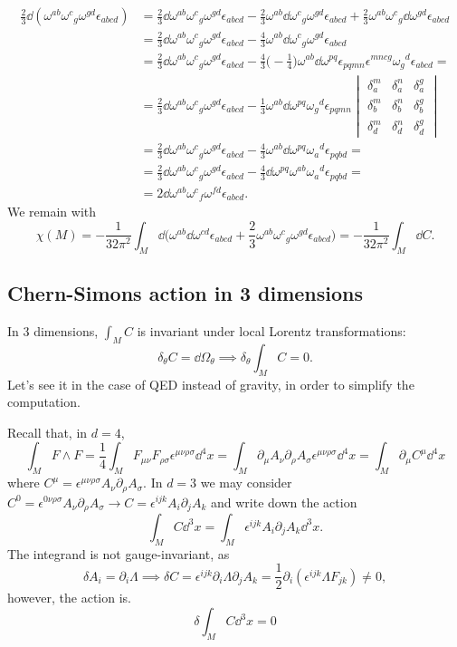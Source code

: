 \documentclass[a4paper,12pt]{book}
\begin{document}
\begin{align*}
\frac23\dd(\omega^{ab}\omega^c{}_g\omega^{gd}\epsilon_{abcd})&=\frac23\dd\omega^{ab}\omega^c{}_g\omega^{gd}\epsilon_{abcd}-\frac23\omega^{ab}\dd\omega^c{}_g\omega^{gd}\epsilon_{abcd}+\frac23\omega^{ab}\omega^c{}_g\dd\omega^{gd}\epsilon_{abcd}\\
&=\frac23\dd\omega^{ab}\omega^c{}_g\omega^{gd}\epsilon_{abcd}-\frac43\omega^{ab}\dd\omega^c{}_g\omega^{gd}\epsilon_{abcd}\\
&=\frac23\dd\omega^{ab}\omega^c{}_g\omega^{gd}\epsilon_{abcd}-\frac43\biggl(-\frac14\biggr)\omega^{ab}\dd\omega^{pq}\epsilon_{pqmn}\epsilon^{mncg}\omega_g{}^d\epsilon_{abcd}=\\
&=\frac23\dd\omega^{ab}\omega^c{}_g\omega^{gd}\epsilon_{abcd}-\frac13\omega^{ab}\dd\omega^{pq}\omega_g{}^d\epsilon_{pqmn}
\begin{vmatrix}
\delta^m_a & \delta^n_a & \delta^g_a\\
\delta^m_b & \delta^n_b & \delta^g_b\\
\delta^m_d & \delta^n_d & \delta^g_d
\end{vmatrix}\\
&=\frac23\dd\omega^{ab}\omega^c{}_g\omega^{gd}\epsilon_{abcd}-\frac43\omega^{ab}\dd\omega^{pq}\omega_a{}^d\epsilon_{pqbd}=\\
&=\frac23\dd\omega^{ab}\omega^c{}_g\omega^{gd}\epsilon_{abcd}-\frac43\dd\omega^{pq}\omega^{ab}\omega_a{}^d\epsilon_{pqbd}=\\
&=2\dd\omega^{ab}\omega^c{}_f\omega^{fd}\epsilon_{abcd}.
\end{align*}
We remain with
\[\chi(M)=-\frac1{32\pi^2}\int_M\dd\biggl(\omega^{ab}\dd\omega^{cd}\epsilon_{abcd}+\frac23\omega^{ab}\omega^c{}_g\omega^{gd}\epsilon_{abcd}\biggr)=-\frac1{32\pi^2}\int_M\dd C.\]

\subsection{Chern-Simons action in 3 dimensions}
In 3 dimensions, $\int_MC$ is invariant under local Lorentz transformations:
\[\delta_\theta C=\dd\Omega_\theta\implies\delta_\theta\int_MC=0.\]
Let's see it in the case of QED instead of gravity, in order to simplify the computation.

Recall that, in $d=4$,
\[\int_MF\wedge F=\frac14\int_MF_{\mu\nu}F_{\rho\sigma}\epsilon^{\mu\nu\rho\sigma}\dd^4x=\int_M\partial_\mu A_\nu\partial_\rho A_\sigma\epsilon^{\mu\nu\rho\sigma}\dd^4x=\int_M\partial_\mu C^\mu\dd^4x\]
where $C^\mu=\epsilon^{\mu\nu\rho\sigma}A_\nu\partial_\rho A_\sigma$. In $d=3$ we may consider $C^0=\epsilon^{0\nu\rho\sigma}A_\nu\partial_\rho A_\sigma\longrightarrow C=\epsilon^{ijk}A_i\partial_jA_k$ and write down the action
\[\int_MC\dd^3x=\int_M\epsilon^{ijk}A_i\partial_jA_k\dd^3x.\]
The integrand is not gauge-invariant, as
\[\delta A_i=\partial_i\Lambda\implies\delta C=\epsilon^{ijk}\partial_i\Lambda\partial_jA_k=\frac12\partial_i(\epsilon^{ijk}\Lambda F_{jk})\ne0,\]
however, the action is.
\[\delta\int_MC\dd^3x=0\]
\end{document}
